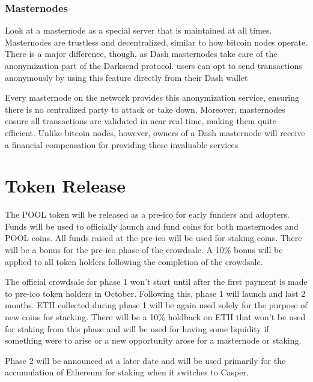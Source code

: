 \subsubsection{Masternodes}
Look at a masternode as a special server that is maintained at all times. Masternodes are trustless and decentralized, similar to how bitcoin nodes operate. There is a major difference, though, as Dash masternodes take care of the anonymization part of the Darksend protocol. users can opt to send transactions anonymously by using this feature directly from their Dash wallet

Every masternode on the network provides this anonymization service, ensuring there is no centralized party to attack or take down. Moreover, masternodes ensure all transactions are validated in near real-time, making them quite efficient. Unlike bitcoin nodes, however, owners of a Dash masternode will receive a financial compensation for providing these invaluable services

\newpage

\section{Token Release}
The POOL token will be released as a pre-ico for early funders and adopters. Funds will be used to officially launch and fund coins for both masternodes and POOL coins. All funds raised at the pre-ico will be used for staking coins. There will be a bonus for the pre-ico phase of the crowdsale. A 10\% bonus will be applied to all token holders following the completion of the crowdsale.   

The official crowdsale for phase 1 won’t start until after the first payment is made to pre-ico token holders in October. Following this, phase 1 will launch and last 2 months. ETH collected during phase 1 will be again used solely for the purpose of new coins for stacking. There will be a 10\% holdback on ETH that won’t be used for staking from this phase and will be used for having some liquidity if something were to arise or a new opportunity arose for a masternode or staking. 

Phase 2 will be announced at a later date and will be used primarily for the accumulation of Ethereum for staking when it switches to Casper.

